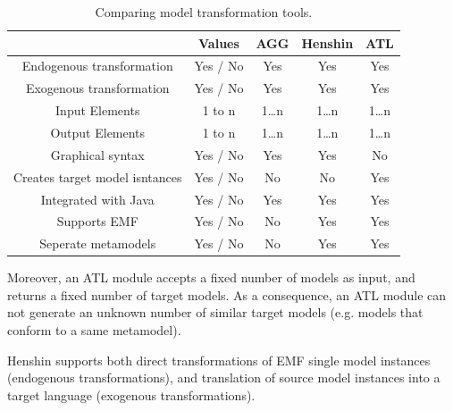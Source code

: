 \documentclass[pdftex,11pt,a4paper]{article}
\begin{document}
\begin{table}[ht]
\centering
\begin{tabular}{| c | c | c | c | c |}
\hline
&Values & AGG & Henshin & ATL \\
\hline
Endogenous transformation& Yes / No & \cellcolor{green!25}Yes &
\cellcolor{green!25}Yes & \cellcolor{green!25}Yes \\

Exogenous transformation& Yes / No & \cellcolor{green!25}Yes &
\cellcolor{green!25}Yes & \cellcolor{green!25}Yes \\

Input Elements& 1 to n & 1\ldots n & 1\ldots n & 1\ldots n\\
Output Elements & 1 to n & 1\ldots n & 1\ldots n & 1\ldots n\\
Graphical syntax& Yes / No &\cellcolor{green!25}Yes &
\cellcolor{green!25}Yes &\cellcolor{red!25}No  \\
Creates target model isntances & Yes / No &\cellcolor{red!25}No &
\cellcolor{red!25}No &\cellcolor{green!25}Yes \\
Integrated with Java& Yes / No & \cellcolor{green!25}Yes &
\cellcolor{green!25}Yes & \cellcolor{green!25}Yes \\
Supports EMF& Yes / No & \cellcolor{red!25}No &
\cellcolor{green!25}Yes & \cellcolor{green!25}Yes \\
Seperate metamodels& Yes / No & \cellcolor{red!25}No &
\cellcolor{green!25}Yes & \cellcolor{green!25}Yes \\
\hline

\end{tabular}
\caption{Comparing model transformation tools.}
\end{table}

Moreover, an ATL module accepts a fixed number of models as input, and returns
a fixed number of target models. As a consequence, an ATL module can not
generate an unknown number of similar target models (e.g. models that conform
to a same metamodel).

Henshin supports both direct transformations of EMF single model instances
(endogenous transformations), and translation of source model instances into a
target language (exogenous transformations).


\pagebreak
 

\end{document}
